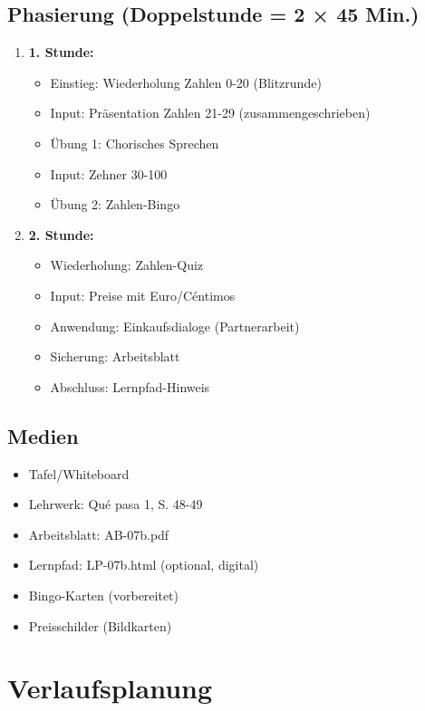 \documentclass[11pt,a4paper]{article}
\newcommand{\lehrwerk}{Qué pasa 1}
\newcommand{\lehrwerkseite}{S. 48-49}
\begin{document}
\subsection{Phasierung (Doppelstunde = 2 × 45 Min.)}
\begin{enumerate}
    \item \textbf{1. Stunde:}
    \begin{itemize}
        \item Einstieg: Wiederholung Zahlen 0-20 (Blitzrunde)
        \item Input: Präsentation Zahlen 21-29 (zusammengeschrieben)
        \item Übung 1: Chorisches Sprechen
        \item Input: Zehner 30-100
        \item Übung 2: Zahlen-Bingo
    \end{itemize}
    \item \textbf{2. Stunde:}
    \begin{itemize}
        \item Wiederholung: Zahlen-Quiz
        \item Input: Preise mit Euro/Céntimos
        \item Anwendung: Einkaufsdialoge (Partnerarbeit)
        \item Sicherung: Arbeitsblatt
        \item Abschluss: Lernpfad-Hinweis
    \end{itemize}
\end{enumerate}

\subsection{Medien}
\begin{itemize}
    \item Tafel/Whiteboard
    \item Lehrwerk: \lehrwerk, \lehrwerkseite
    \item Arbeitsblatt: AB-07b.pdf
    \item Lernpfad: LP-07b.html (optional, digital)
    \item Bingo-Karten (vorbereitet)
    \item Preisschilder (Bildkarten)
\end{itemize}

\section{Verlaufsplanung}
\end{document}
